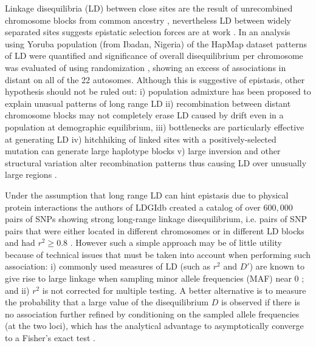 Linkage disequilibria (LD) between close sites are the result of unrecombined chromosome blocks from common ancestry \cite{reich2001linkage}, nevertheless LD between widely separated sites suggests epistatic selection forces are at work \cite{fisher1958genetical, koch2013long}.
In an analysis using Yoruba population (from Ibadan, Nigeria) of the HapMap dataset patterns of LD were quantified and significance of overall disequilibrium per chromosome was evaluated of using randomization \cite{koch2013long}, showing an excess of associations in distant on all of the 22 autosomes. 
Although this is suggestive of epistasis, other hypothesis should not be ruled out:
i) population admixture has been proposed to explain unusual patterns of long range LD \cite{price2008long}
ii) recombination between distant chromosome blocks may not completely erase LD caused by drift even in a population at demographic equilibrium, 
iii) bottlenecks are particularly effective at generating LD
iv) hitchhiking of linked sites with a positively-selected mutation can generate large haplotype blocks 
v) large inversion and other structural variation alter recombination patterns thus causing LD over unusually large regions \cite{bansal2007evidence}.

Under the assumption that long range LD can hint epistasis due to physical protein interactions the authors of LDGIdb \cite{wang2012ldgidb} created a catalog of over $600,000$ pairs of SNPs showing strong long-range linkage disequilibrium, i.e. pairs of SNP pairs that were either located in different chromosomes or in different LD blocks and had $r^2 \ge 0.8$ \cite{wang2012ldgidb}.
However such a simple approach may be of little utility because of technical issues that must be taken into account when performing such association: i) commonly used measures of LD (such as $r^2$ and $D'$) are known to give rise to large linkage when sampling minor allele frequencies (MAF) near 0 \cite{koch2013long}; and ii) $r^2$ is not corrected for multiple testing.
A better alternative is to measure the probability that a large value of the disequilibrium $D$ is observed if there is no association further refined by conditioning on the sampled allele frequencies (at the two loci), which has the analytical advantage to asymptotically converge to a Fisher's exact test \cite{koch2013long}.

